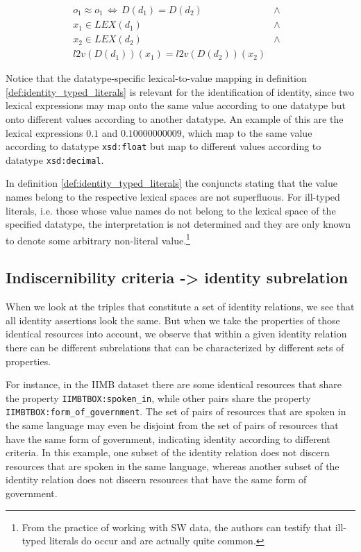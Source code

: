 \small
\begin{definition}
\label{def:identity_typed_literals}
\begin{align}
  o_1 \approx o_1
\,\iff\,
    D(d_1) = D(d_2)
  &\land&\\
    x_1 \in LEX(d_1)
  &\land&\nonumber\\
    x_2 \in LEX(d_2)
  &\land&\nonumber\\
    l2v(D(d_1))(x_1) = l2v(D(d_2))(x_2)\nonumber
\end{align}
\end{definition}
\normalsize

Notice that the datatype-specific lexical-to-value mapping
  in definition \ref{def:identity_typed_literals} is relevant for
  the identification of identity,
  since two lexical expressions may map onto the same value
  according to one datatype but onto different values
  according to another datatype.
An example of this are the lexical expressions $0.1$ and $0.10000000009$,
  which map to the same value according to datatype \texttt{xsd:float}
  but map to different values according to datatype \texttt{xsd:decimal}.

In definition \ref{def:identity_typed_literals} the conjuncts
  stating that the value names belong to the respective lexical spaces
  are not superfluous.
For ill-typed literals,
  i.e. those whose value names do not belong to the lexical space of
  the specified datatype,
  the interpretation is not determined and they are only known to denote
  some arbitrary non-literal value.\footnote{
    From the practice of working with SW data, the authors can testify
    that ill-typed literals do occur and are actually quite common.}

\subsection{Indiscernibility criteria -> identity subrelation}

When we look at the triples that constitute a set of identity relations,
  we see that all identity assertions look the same.
But when we take the properties of those identical resources into account,
  we observe that within a given identity relation there can be different
  subrelations that can be characterized by different sets of properties.

For instance, in the IIMB dataset there are some identical resources that
  share the property \verb|IIMBTBOX:spoken_in|, while other pairs share
  the property \verb|IIMBTBOX:form_of_government|.
The set of pairs of resources that are spoken in the same language may even
  be disjoint from the set of pairs of resources that have the same
  form of government, indicating identity according to different criteria.
In this example, one subset of the identity relation does not discern
  resources that are spoken in the same language, whereas another subset
  of the identity relation does not discern resources that have the same
  form of government.

